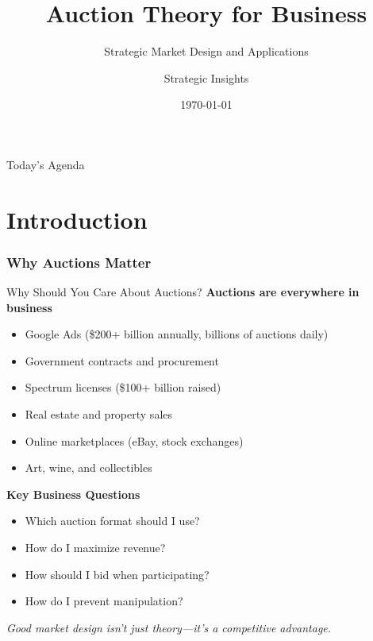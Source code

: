 \documentclass[xcolor={x11names}, aspectratio=169 ]{beamer}
\title{Auction Theory for Business}
\subtitle{Strategic Market Design and Applications}
\author{Strategic Insights}
\date{\today}
\begin{document}
\begin{frame}
  \titlepage
\end{frame}

\begin{frame}{Today's Agenda}
  \tableofcontents
\end{frame}

\part{Introduction}
\section{Why Auctions Matter}

\begin{frame}{Why Should You Care About Auctions?}
\textbf{Auctions are everywhere in business}
\begin{itemize}
  \item Google Ads (\$200+ billion annually, billions of auctions daily)
  \item Government contracts and procurement
  \item Spectrum licenses (\$100+ billion raised)
  \item Real estate and property sales
  \item Online marketplaces (eBay, stock exchanges)
  \item Art, wine, and collectibles
\end{itemize}

\textbf{Key Business Questions}
\begin{itemize}
  \item Which auction format should I use?
  \item How do I maximize revenue?
  \item How should I bid when participating?
  \item How do I prevent manipulation?
\end{itemize}

\textit{Good market design isn't just theory—it's a competitive advantage.}
\end{frame}
\end{document}
